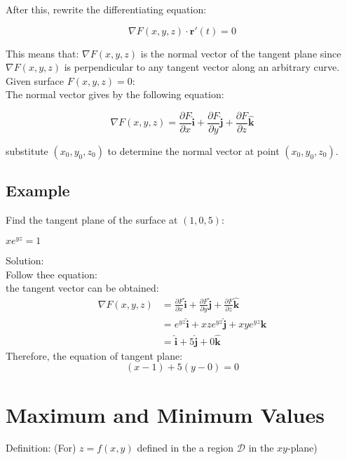 \documentclass[UTF8,a4paper, 10pt, openany]{svmono}
\begin{document}
After this, rewrite the differentiating equation:

\begin{equation}
\boxed{
\nabla F(x,y,z)\cdot \mathbf{r}'(t)=0
}
\end{equation}

This means that: $\nabla F(x,y,z)$ is the normal vector of the tangent plane since $\nabla F(x,y,z)$ is perpendicular to any tangent vector along an arbitrary curve.\\ 

Given surface $F(x,y,z)=0$:\\

The normal vector gives by the following equation:

\begin{equation}
\boxed{
\nabla F(x,y,z)=\frac{\partial F}{\partial x}\mathbf{\hat{i}}+\frac{\partial F}{\partial y}\mathbf{\hat{j}}+\frac{\partial F}{\partial z}\mathbf{\hat{k}}
}
\end{equation}

substitute $(x_0,y_0,z_0)$ to determine the normal vector at point $(x_0,y_0,z_0)$.

\subsection{Example}
Find the tangent plane of the surface at $(1,0,5)$:
\begin{center}
$xe^{yz}=1$
\end{center}
Solution:\\
Follow thee equation:\\
the tangent vector can be obtained:
\begin{align*}
\nabla F(x,y,z)&=\frac{\partial F}{\partial x}\mathbf{\hat{i}} + \frac{\partial F}{\partial y}\mathbf{\hat{j}}+\frac{\partial F}{\partial z}\mathbf{\hat{k}}	\\
&= e^{yz}\mathbf{\hat{i}}+xze^{yz}\mathbf{\hat{j}}+xye^{yz}\mathbf{\hat{k}}\\
&= \mathbf{\hat{i}}+5\mathbf{\hat{j}}+0\mathbf{\hat{k}}
\end{align*}
Therefore, the equation of tangent plane:
\[(x-1)+5(y-0)=0\]

\section{Maximum and Minimum Values}
Definition: (For) $z=f(x,y)$ defined in the a region $\mathcal{D}$ in the $xy$-plane)
\end{document}
